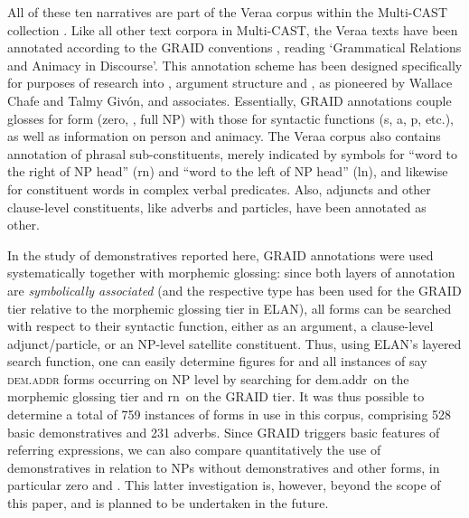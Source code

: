 \documentclass[output=paper
,modfonts
,nonflat]{langsci/langscibook}
\begin{document}
\noindent
All of these ten narratives are part of the Vera{\textquotesingle}a corpus \cite{Schnell2016a} within the Multi-CAST collection . Like all other text corpora in Multi-CAST, the Vera{\textquotesingle}a texts have been annotated according to the GRAID conventions \citep{HaigSchnell2014}, reading `Grammatical Relations and Animacy in Discourse'. This annotation scheme has been designed specifically for purposes of research into , argument structure and , as pioneered by Wallace Chafe and Talmy Giv\'on, and associates. Essentially, GRAID annotations couple glosses for form (zero, , full NP) with those for syntactic functions (s, a, p, etc.), as well as information on person and animacy. The Vera{\textquotesingle}a corpus also contains annotation of phrasal sub-constituents, merely indicated by symbols for ``word to the right of NP head'' (\textlangle rn\textrangle) and ``word to the left of NP head'' (\textlangle ln\textrangle), and likewise for constituent words in complex verbal predicates. Also, adjuncts and other clause-level constituents, like adverbs and particles, have been annotated as \textlangle other\textrangle.

In the study of demonstratives reported here, GRAID annotations were used systematically together with morphemic glossing: since both layers of annotation are \textit{symbolically associated} (and the respective type has been used for the GRAID tier relative to the morphemic glossing tier in ELAN), all  forms can be searched with respect to their syntactic function, either as an argument, a clause-level adjunct/particle, or an NP-level satellite constituent. Thus, using ELAN's layered search function, one can easily determine figures for and all instances of say \textsc{dem.addr} forms occurring on NP level by searching for \textlangle dem.addr\textrangle\  on the morphemic glossing tier and \textlangle rn\textrangle\ on the GRAID tier. It was thus possible to determine a total of 759 instances of  forms in use in this corpus, comprising 528 basic demonstratives and 231  adverbs. Since GRAID triggers basic features of referring expressions, we can also compare quantitatively the use of demonstratives in relation to NPs without demonstratives and other forms, in particular zero and . This latter investigation is, however, beyond the scope of this paper, and is planned to be undertaken in the future.
\end{document}
